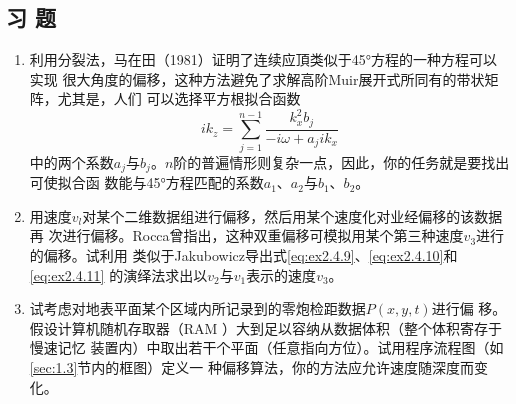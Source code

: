 \subsection{习 题}
\label{sec:2.4.9}

\begin{enumerate}
\item 利用分裂法，马在田（1981）证明了连续应頂类似于45°方程的一种方程可以实现
很大角度的偏移，这种方法避免了求解高阶Muir展开式所同有的带状矩阵，尤其是，人们
可以选择平方根拟合函数
\begin{equation*}
ik_z=\sum_{j=1}^{n-1}\frac{k_x^2b_j}{-i\omega+a_jik_x}
\end{equation*}
中的两个系数$a_j$与$b_j$。$n$阶的普遍情形则复杂一点，因此，你的任务就是要找出可使拟合函
数能与45°方程匹配的系数$a_1$、$a_2$与$b_1$、$b_2$。
\item 用速度$v_l$对某个二维数据组进行偏移，然后用某个速度化对业经偏移的该数据再
次进行偏移。Rocca曾指出，这种双重偏移可模拟用某个第三种速度$v_3$进行的偏移。试利用
类似于Jakubowicz导出式\ref{eq:ex2.4.9}、\ref{eq:ex2.4.10}和\ref{eq:ex2.4.11}
的演绎法求出以$v_2$与$v_1$表示的速度$v_3$。
\item   试考虑对地表平面某个区域内所记录到的零炮检距数据$P(x,y,t)$进行偏
  移。假设计算机随机存取器（RAM
  ）大到足以容纳从数据体积（整个体积寄存于慢速记忆
  装置内）中取出若干个平面（任意指向方位）。试用程序流程图（如\ref{sec:1.3}节内的框图）定义一 种偏移算法，你的方法应允许速度随深度而变化。
\end{enumerate}

